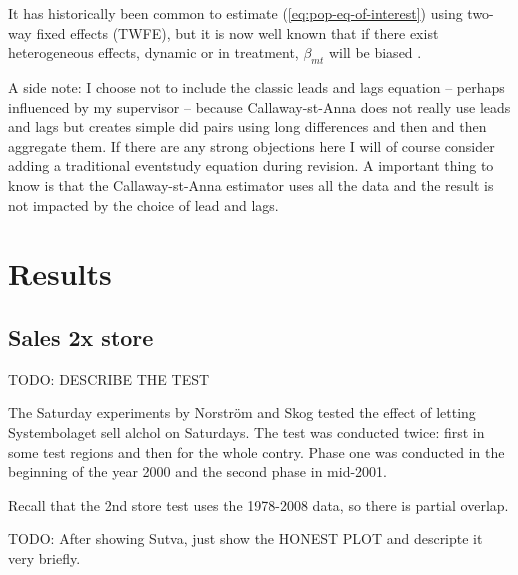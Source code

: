 \documentclass[12pt]{article}
\begin{document}
It has historically been common to estimate (\ref{eq:pop-eq-of-interest}) using two-way fixed effects (TWFE), but it is now well known that if there exist heterogeneous effects, dynamic or in treatment, $\beta_{mt}$ will be biased \parencite{roth2023a}.

A side note: I choose not to include the classic leads and lags equation -- perhaps influenced by my supervisor -- because Callaway-st-Anna does not really use leads and lags but creates simple did pairs using long differences and then and then aggregate them. If there are any strong objections here I will of course consider adding a traditional eventstudy equation during revision. A important thing to know is that the Callaway-st-Anna estimator uses all the data and the result is not impacted by the choice of lead and lags. 


\section{Results}


\subsection{Sales 2x store}
TODO: DESCRIBE THE TEST

The Saturday experiments by Norström and Skog tested the effect of letting Systembolaget sell alchol on Saturdays. The test was conducted twice: first in some test regions and then for the whole contry. Phase one was conducted in the beginning of the year 2000 and the second phase in mid-2001. 

Recall that the 2nd store test uses the 1978-2008 data, so there is partial overlap.



TODO: After showing Sutva, just show the HONEST PLOT and descripte it very briefly. 

 
 
\end{document}
